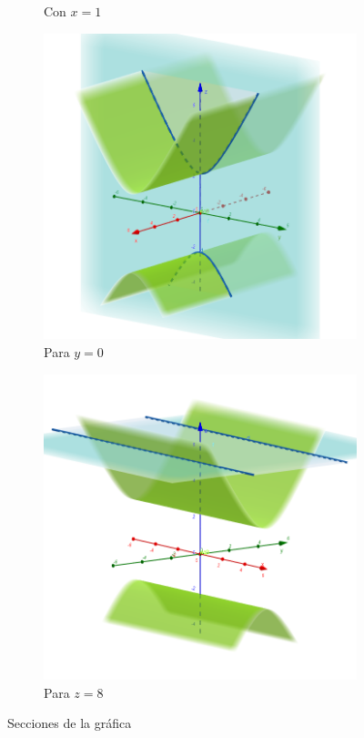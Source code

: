 \documentclass[letterpaper,11pt]{article}
\begin{document}
\begin{enumerate}
\begin{figure}[h!]
\begin{subfigure}{0.3\textwidth}
		\caption{Con $ x = 1 $}
	\end{subfigure}
	\begin{subfigure}{0.3\textwidth}
		\includegraphics[width=\linewidth]{img/2e2_2}
		\caption{Para $ y = 0 $}
	\end{subfigure}
	\begin{subfigure}{0.3\textwidth}
		\includegraphics[width=\linewidth]{img/2e2_3}
		\caption{Para $ z = 8 $}
	\end{subfigure}
	\caption{Secciones de la gráfica }
\end{figure}

\end{enumerate}
\end{document}
